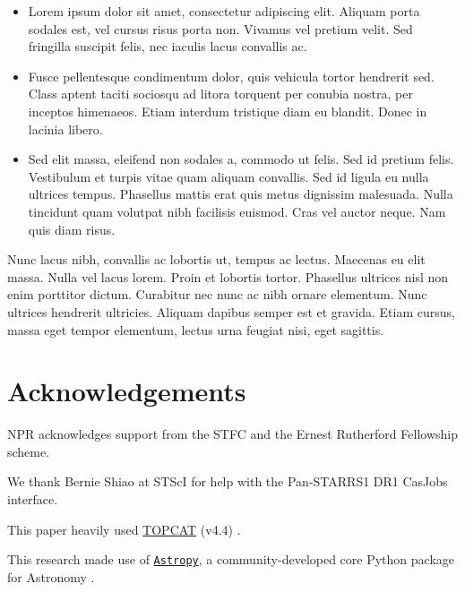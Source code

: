 \documentclass[usenatbib]{mnras}
\begin{document}
\begin{itemize}
    \item Lorem ipsum dolor sit amet, consectetur adipiscing
      elit. Aliquam porta sodales est, vel cursus risus porta non. Vivamus
      vel pretium velit. Sed fringilla suscipit felis, nec iaculis lacus
      convallis ac. 
    \item Fusce pellentesque condimentum dolor, quis vehicula
      tortor hendrerit sed. Class aptent taciti sociosqu ad litora torquent
      per conubia nostra, per inceptos himenaeos. Etiam interdum tristique
      diam eu blandit. Donec in lacinia libero.
    \item Sed elit massa, eleifend non sodales a, commodo ut felis. Sed id
      pretium felis. Vestibulum et turpis vitae quam aliquam convallis. Sed
      id ligula eu nulla ultrices tempus. Phasellus mattis erat quis metus
      dignissim malesuada. Nulla tincidunt quam volutpat nibh facilisis
      euismod. Cras vel auctor neque. Nam quis diam risus.
\end{itemize}
Nunc lacus nibh, convallis ac lobortis ut, tempus ac lectus. Maecenas
eu elit massa. Nulla vel lacus lorem. Proin et lobortis
tortor. Phasellus ultrices nisl non enim porttitor dictum. Curabitur
nec nunc ac nibh ornare elementum. Nunc ultrices hendrerit
ultricies. Aliquam dapibus semper est et gravida. Etiam cursus, massa
eget tempor elementum, lectus urna feugiat nisi, eget sagittis.


\section*{Acknowledgements}
NPR acknowledges support from the STFC and the Ernest Rutherford Fellowship scheme. 

We thank Bernie Shiao at STScI for help with the Pan-STARRS1 DR1 CasJobs interface. 

This paper heavily used \href{http://www.star.bris.ac.uk/~mbt/topcat/}{TOPCAT} (v4.4)
\citep[][]{Taylor2005, Taylor2011}.

This research made use of \href{http://www.astropy.org}{\tt Astropy}, 
a community-developed core Python package for Astronomy 
\citep{AstropyCollaboration2013, AstropyCollaboration2018}. 
\end{document}
